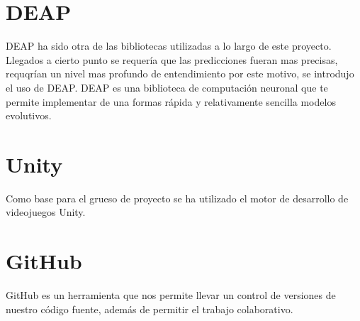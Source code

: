 \section{DEAP}
DEAP ha sido otra de las bibliotecas utilizadas a lo largo de este proyecto. Llegados a cierto punto se requería que las predicciones fueran mas precisas, requqrían un nivel mas profundo de entendimiento \cite{fortin2012deap} por este motivo, se introdujo el uso de DEAP. DEAP es una biblioteca de computación neuronal que te permite implementar de una formas rápida y relativamente sencilla modelos evolutivos.

\section{Unity}
Como base para el grueso de proyecto se ha utilizado el motor de desarrollo de videojuegos Unity.

\section{GitHub}
GitHub es un herramienta que nos permite llevar un control de versiones de nuestro código fuente, además de permitir el trabajo colaborativo.


